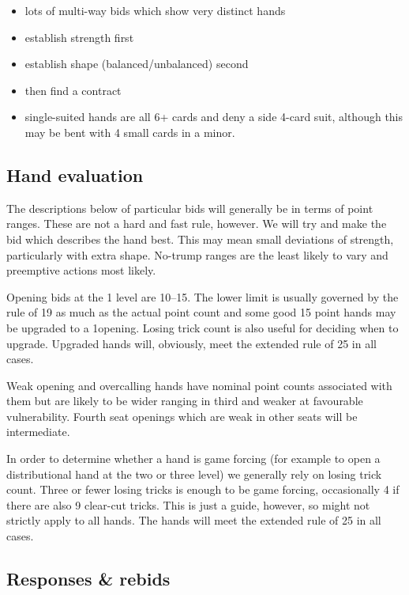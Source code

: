 \documentclass[a4paper,14pt]{extarticle}
\begin{document}
\begin{itemize}
\item lots of multi-way bids which show very distinct hands
\item establish strength first
\item establish shape (balanced/unbalanced) second
\item then find a contract
\item single-suited hands are all 6+ cards and deny a side 4-card suit, although
this may be bent with 4 small cards in a minor.
\end{itemize}

\subsection{Hand evaluation}

The descriptions below of particular bids will generally be in terms of point
ranges. These are not a hard and fast rule, however. We will try and make the
bid which describes the hand best. This may mean small deviations of strength, 
particularly with extra shape. No-trump ranges are the least likely to vary and
preemptive actions most likely.

Opening bids at the 1 level are 10--15. The lower limit is usually governed by
the rule of 19 as much as the actual point count and some good 15 point hands
may be upgraded to a 1\diamonds opening. Losing trick count is also 
useful for deciding when to upgrade. Upgraded hands will, obviously, meet the
extended rule of 25 in all cases. 

Weak opening and overcalling hands have nominal point counts associated with
them but are likely to be wider ranging in third and weaker at favourable
vulnerability. Fourth seat openings which are weak in other seats will be 
intermediate.

In order to determine whether a hand is game forcing (for example to open a
distributional hand at the two or three level) we generally
rely on losing trick count. Three or fewer losing tricks is enough to be game
forcing, occasionally 4 if there are also 9 clear-cut tricks. This is just a
guide, however, so might not strictly apply to all hands. The hands will meet
the extended rule of 25 in all cases.

\newpage



\subsection{Responses \& rebids}
\label{sec:responses}
\end{document}
